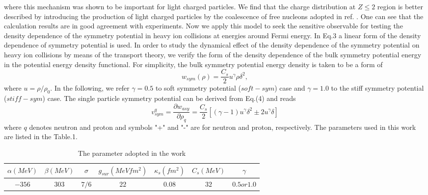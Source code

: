 \documentclass[aps,prc,groupedaddress,showpacs,manuscript]{revtex4}
\begin{document}
\cite{Neu00} where this mechanism was shown to be important for
light charged particles. We find that the charge distribution at
$Z \leq 2$ region is better described by introducing the
production of light charged particles by the coalescence of free
nucleons adopted in ref. \cite{Neu00}. One can see that the
calculation results are in good agreement with experiments. Now we
apply this model to seek the sensitive observable for testing the
density dependence of the symmetry potential in heavy ion
collisions at energies around Fermi energy. In Eq.3 a linear form
of the density dependence of symmetry potential is used. In order
to study the dynamical effect of the density dependence of the
symmetry potential on heavy ion collisions by means of the
transport theory, we verify the form of the density dependence of
the bulk symmetry potential energy in the potential energy density
functional. For simplicity, the bulk symmetry potential energy
density is taken to be a form of
\begin{equation}
w_{sym}(\rho)=\frac{C_{s}}{2}u^{\gamma}\rho\delta^{2},
\end{equation}
where $u=\rho/\rho_{0}$. In the following, we refer $\gamma=0.5$
to soft symmetry potential ($soft-sym$) case and $\gamma=1.0$ to
the stiff symmetry potential ($stiff-sym$) case. The single
particle symmetry potential can be derived from Eq.(4) and reads
\begin{equation}
v^{q}_{sym}=\frac{\partial w_{asy}}{\partial
\rho_{q}}=\frac{C_{s}}{2}[(\gamma-1)u^{\gamma}\delta^{2}\pm2u^{\gamma}\delta]
\end{equation}
where $q$ denotes neutron and proton and symbols "+" and "-" are
for neutron and proton, respectively. The parameters used in this
work are listed in the Table.1.

\begin{table}[htbp]
 \caption{The parameter adopted in the work} \label{Table.1}
\begin{tabular}{ccccccc}
\hline
\hline
  $\alpha(MeV)$ & $\beta(MeV)$ & $\sigma$ & $g_{sur}(MeVfm^{2})$ & $\kappa_{s}(fm^{2})$ & $C_{s}(MeV)$ & $\gamma$ \\
\hline
  $-356$ & $303$ & $7/6$ & $22$ & $0.08$ & $32$ & $0.5or1.0$ \\
\hline
\hline
\end{tabular}
\end{table}
\end{document}
